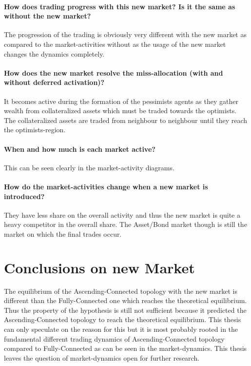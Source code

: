 \documentclass[Bachelorarbeit.tex]{subfiles}
\begin{document}
\paragraph{How does trading progress with this new market? Is it the same as without the new market?}
The progression of the trading is obviously very different with the new market as compared to the market-activities without as the usage of the new market changes the dynamics completely.

\paragraph{How does the new market resolve the miss-allocation (with and without deferred activation)?}
It becomes active during the formation of the pessimists agents as they gather wealth from collateralized assets which must be traded towards the optimists. The collateralized assets are traded from neighbour to neighbour until they reach the optimists-region.

\paragraph{When and how much is each market active?}
This can be seen clearly in the market-activity diagrams.

\paragraph{How do the market-activities change when a new market is introduced?}
They have less share on the overall activity and thus the new market is quite a heavy competitor in the overall share. The Asset/Bond market though is still the market on which the final trades occur.

\section{Conclusions on new Market}
The equilibrium of the Ascending-Connected topology with the new market is different than the Fully-Connected one which reaches the theoretical equilibrium. Thus the property of the hypothesis is still not sufficient because it predicted the Ascending-Connected topology to reach the theoretical equilibrium. This thesis can only speculate on the reason for this but it is most probably rooted in the fundamental different trading dynamics of Ascending-Connected topology compared to Fully-Connected as can be seen in the market-dynamics. This thesis leaves the question of market-dynamics open for further research.
\end{document}
